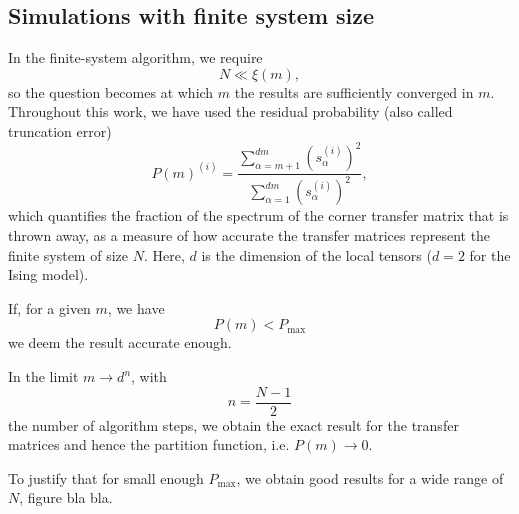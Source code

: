 \subsection{Simulations with finite system size}
In the finite-system algorithm, we require
\begin{equation}
  N \ll \xi(m),
\end{equation}
so the question becomes at which $m$ the results are sufficiently converged in $m$. Throughout this work, we have used
the residual probability (also called truncation error)
\begin{equation}
  P(m)^{(i)} = \frac{\sum_{\alpha = m + 1}^{dm} (s_{\alpha}^{(i)})^2 }{ \sum_{\alpha = 1}^{dm} (s_{\alpha}^{(i)})^2 },
\end{equation}
which quantifies the fraction of the spectrum of the corner transfer matrix that is thrown away, as a measure of how
accurate the transfer matrices represent the finite system of size $N$. Here, $d$ is the
dimension of the local tensors ($d = 2$ for the Ising model).

If, for a given $m$, we have
\begin{equation}
  P(m) < P_{\text{max}}
\end{equation}
we deem the result accurate enough.

In the limit $m \to d^n$, with
\begin{equation}
  n = \frac{N - 1}{2}
\end{equation}
the number of algorithm steps, we obtain the exact result for the transfer matrices and hence the partition function,
i.e. $P(m) \to 0$.

To justify that for small enough $P_{\max}$, we obtain good results for a wide range of $N$, figure bla bla.
